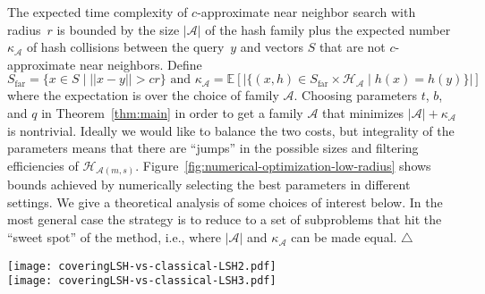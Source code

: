 \documentclass[prodmode,acmtalg]{acmsmall}
\newcommand{\E}[1]{\mathbb{E}\left[#1\right]}
\begin{document}
The expected time complexity of $c$-approximate near neighbor search with radius~$r$ is bounded by the size $|\mathcal{A}|$ of the hash family plus the expected number $\kappa_\mathcal{A}$ of hash collisions between the query~$y$ and vectors $S$ that are not $c$-approximate near neighbors. Define
$$S_\text{far} = \{ x\in S \; | \; ||x-y|| > cr \} \text{ and }
\kappa_\mathcal{A} = \E{ | \{ (x,h)\in S_\text{far} \times \mathcal{H}_{\mathcal{A}} \;|\; h(x)=h(y) \} | }$$
where the expectation is over the choice of family $\mathcal{A}$.
Choosing parameters $t$, $b$, and $q$ in Theorem~\ref{thm:main} in order to get a family $\mathcal{A}$ that minimizes $|\mathcal{A}| + \kappa_\mathcal{A}$ is nontrivial.
Ideally we would like to balance the two costs, but integrality of the parameters means that there are ``jumps'' in the possible sizes and filtering efficiencies of
$\mathcal{H}_{\mathcal{A}(m,s)}$. Figure~\ref{fig:numerical-optimization-low-radius} shows bounds achieved by numerically selecting the best parameters in different settings. We give a theoretical analysis of some choices of interest below. In the most general case the strategy is to reduce to a set of subproblems that hit the ``sweet spot'' of the method, i.e., where $|\mathcal{A}|$ and $\kappa_\mathcal{A}$ can be made equal. $\triangle$

\begin{figure*}[t]
	\begin{center}
	\texttt{[image: coveringLSH-vs-classical-LSH2.pdf]}\\
	\bigskip
	\texttt{[image: coveringLSH-vs-classical-LSH3.pdf]}
	\caption{Expected number of memory accesses for different similarity search methods for finding a vector within Hamming distance~$r$ of a query vector~$y$. The plots are for $r=16$ and $r=256$, respectively, and are for a worst-case data set where all points have distance~$2r$ from~$y$, i.e., there exists no $c$-approximate near neighbor for an approximation factor $c<2$. The bound for exhaustive search in a Hamming ball of radius $r$ optimistically assumes that the number of dimensions is~$\log_2 n$, which is smallest possible for a data set of size $n$ (for $r=256$ this number is so large that it is not even shown).
	Two bounds are shown for the classical LSH method of Indyk and Motwani: A small fixed false negative probability of 1\%, and a false negative probability of $1/n$.
	The latter is what is needed to ensure no false negatives in a sequence of $n$ searches.
	The bound for CoveringLSH in the case $r=16$ uses a single partition ($b=1$), while for $r=256$ multiple partitions are used.}\label{fig:numerical-optimization-low-radius}
	\end{center}
\end{figure*}
\end{document}
